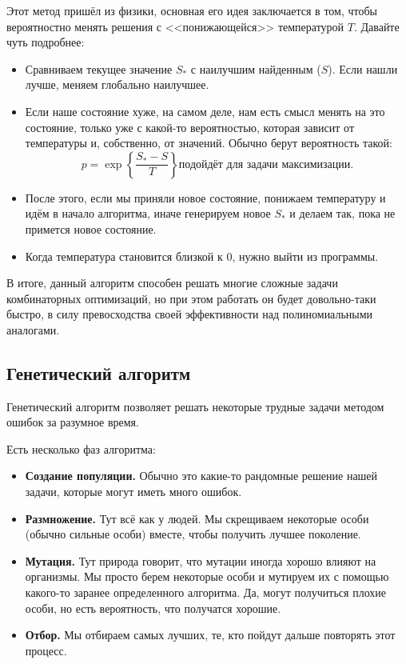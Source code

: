 \documentclass[a4paper, 12pt]{article}
\begin{document}
Этот метод пришёл из физики, основная его идея заключается
в том, чтобы вероятностно менять решения с <<понижающейся>>
температурой $T$. Давайте чуть подробнее:

\begin{itemize}
  \item Сравниваем текущее значение $S_*$ с наилучшим найденным ($S$).
  Если нашли лучше, меняем глобально наилучшее.
  \item Если наше состояние хуже, на самом деле, нам есть
  смысл менять на это состояние, только уже с какой-то
  вероятностью, которая зависит от температуры и, собственно,
  от значений. Обычно берут вероятность такой:
  \[
    p = \exp\left\{\frac{S_* - S}{T}\right\} \text{подойдёт для задачи максимизации.}
  \]
  \item После этого, если мы приняли новое состояние,
  понижаем температуру и идём в начало алгоритма, иначе генерируем
  новое $S_*$ и делаем так, пока не примется новое состояние.
  \item Когда температура становится близкой к 0, нужно выйти
  из программы.
\end{itemize}

В итоге, данный алгоритм способен решать многие сложные задачи комбинаторных
оптимизаций, но при этом работать он будет довольно-таки быстро,
в силу превосходства своей эффективности над полиномиальными аналогами.

\subsection{Генетический алгоритм}

Генетический алгоритм позволяет решать некоторые трудные задачи методом ошибок
за разумное время.

Есть несколько фаз алгоритма:

\begin{itemize}
  \item {\bf Создание популяции.} Обычно это какие-то рандомные решение нашей 
  задачи, которые могут иметь много ошибок.
  \item {\bf Размножение.} Тут всё как у людей. Мы скрещиваем некоторые особи 
  (обычно сильные особи) вместе, чтобы получить лучшее поколение.
  \item {\bf Мутация.} Тут природа говорит, что мутации иногда хорошо влияют
  на организмы. Мы просто берем некоторые особи и мутируем их с помощью
  какого-то заранее определенного алгоритма. Да, могут получиться плохие
  особи, но есть вероятность, что получатся хорошие.
  \item {\bf Отбор.} Мы отбираем самых лучших, те, кто пойдут дальше повторять
  этот процесс.
\end{itemize}
\end{document}
